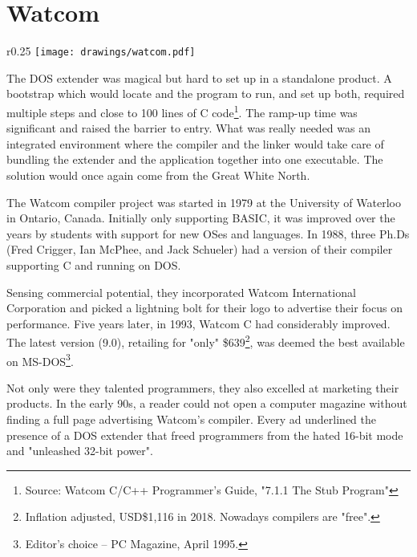 \section{Watcom}

\begin{wrapfigure}[9]{r}{0.25\textwidth}
\centering
\texttt{[image: drawings/watcom.pdf]}
\end{wrapfigure}


The DOS extender was magical but hard to set up in a standalone product. A bootstrap which would locate  and the program to run, and set up both, required multiple steps and close to 100 lines of C code\footnote{Source: Watcom C/C++ Programmer's Guide, "7.1.1 The Stub Program"}. The ramp-up time was significant and raised the barrier to entry. What was really needed was an integrated environment where the compiler and the linker would take care of bundling the extender and the application together into one executable. The solution would once again come from the Great White North.\\ 
\par

The Watcom compiler project was started in 1979 at the University of Waterloo in Ontario, Canada. Initially only supporting BASIC, it was improved over the years by students with support for new OSes and languages. In 1988, three Ph.Ds (Fred Crigger, Ian McPhee, and Jack Schueler) had a version of their compiler supporting C and running on DOS.\\
\par
Sensing commercial potential, they incorporated Watcom International Corporation and picked a lightning bolt for their logo to advertise their focus on performance. Five years later, in 1993, Watcom C had considerably improved. The latest version (9.0), retailing for "only" \$639\footnote{Inflation adjusted, USD\$1,116 in 2018. Nowadays compilers are "free".}, was deemed the best available on MS-DOS\footnote{Editor's choice -- PC Magazine, April 1995.}. \\
\par
Not only were they talented programmers, they also excelled at marketing their products. In the early 90s, a reader could not open a computer magazine without finding a full page advertising Watcom's compiler. Every ad underlined the presence of a DOS extender that freed programmers from the hated 16-bit mode and "unleashed 32-bit power".
\par
\label{watcomad}



